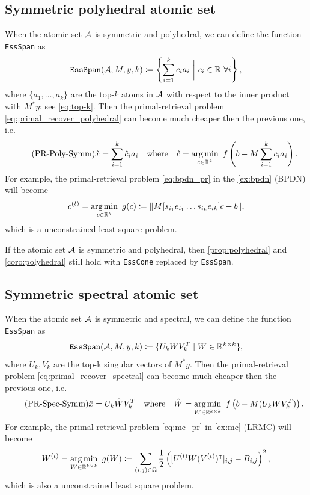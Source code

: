 \subsection{Symmetric polyhedral atomic set}
When the atomic set $\mathcal{A}$ is symmetric and polyhedral, we can define the function \texttt{EssSpan} as 
\[\texttt{EssSpan}(\mathcal{A}, M, y, k) \coloneqq \left\{\sum_{i=1}^k c_i a_i ~\bigg\vert~ c_i \in \mathbb{R} ~\forall i\right\},\]
where $\{a_1, \dots, a_k\}$ are the top-$k$ atoms in $\mathcal{A}$ with respect to the inner product with $M^*y$; see \eqref{eq:top-k}. Then the primal-retrieval problem \eqref{eq:primal_recover_polyhedral} can become much cheaper then the previous one, i.e.
\begin{equation} \label{eq:primal_recover_polyhedral2} \tag{PR-Poly-Symm}
\hat x = \sum_{i=1}^k \hat c_ia_i \hbox{\quad where\quad} \hat c = \underset{c \in \mathbb{R}^k}{\textrm{arg}\,{\min}}\enskip f\left( b - M\sum_{i=1}^k c_ia_i \right). 
\end{equation}
For example, the primal-retrieval problem \eqref{eq:bpdn_pr} in the \autoref{ex:bpdn} (BPDN) will become 
\begin{equation} \label{eq:bpdn_pr2}
    c^{(t)} = \underset{c \in \mathbb{R}^k}{\textrm{arg}\,{\min}}\enskip g(c) \coloneqq \|M[s_{i_1}e_{i_1} \dots s_{i_k}e_{ik}]c - b\|,
\end{equation}
which is a unconstrained least square problem. 

\begin{corollary}
    If the atomic set $\mathcal{A}$ is symmetric and polyhedral, then \autoref{prop:polyhedral} and \autoref{coro:polyhedral} still hold with \texttt{EssCone} replaced by \texttt{EssSpan}. 
\end{corollary}

\subsection{Symmetric spectral atomic set}
When the atomic set $\mathcal{A}$ is symmetric and spectral, we can define the function \texttt{EssSpan} as 
\[
    \texttt{EssSpan}(\mathcal{A}, M, y, k) \coloneqq \{U_kWV_k^T \mid W \in \mathbb{R}^{k\times k}\},
\]
where $U_k, V_k$ are the top-k singular vectors of $M^*y$. Then the primal-retrieval problem \eqref{eq:primal_recover_spectral} can become much cheaper then the previous one, i.e.
\begin{equation} \label{eq:primal_recover_spectral2} \tag{PR-Spec-Symm}
\hat x = U_k\hat W V_k^T \hbox{\quad where\quad} \hat W = \underset{W \in \mathbb{R}^{k\times k}}{\textrm{arg}\,{\min}}\enskip f\left( b - M(U_k W V_k^T) \right).
\end{equation}
For example, the primal-retrieval problem \eqref{eq:mc_pr} in \autoref{ex:mc} (LRMC) will become 
\begin{equation} \label{eq:mc_pr2}
    W^{(t)} = \underset{W \in \mathbb{R}^{k\times k}}{\textrm{arg}\,{\min}}\enskip g(W) \coloneqq \sum_{(i,j) \in \Omega}  \frac{1}{2}\left([U^{(t)}W(V^{(t)})^\intercal]_{i,j} - B_{i,j}\right)^2,
\end{equation}
which is also a unconstrained least square problem. 


